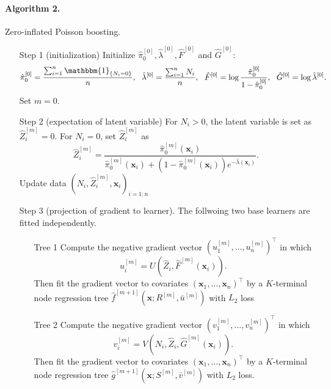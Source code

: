 \documentclass[11pt]{article}
\numberwithin{equation}{section}
\def\bx{\boldsymbol{x}}
\begin{document}
\paragraph{Algorithm 2.} Zero-inflated Poisson boosting.
\begin{itemize}
	\item[Step 1] (initialization)  Initialize $\hat{\pi}_0^{[0]}, \hat{\lambda}^{[0]}, \hat{F}^{[0]}$ and $\hat{G}^{[0]}$:
	$$\hat{\pi}_0^{[0]}=\frac{\sum_{i=1}^n\mathbbm{1}_{\{N_i=0\}}}{n},~~ \hat{\lambda}^{[0]}=\frac{\sum_{i=1}^nN_i}{n},~~
	\hat{F}^{[0]}=\log\frac{\hat{\pi}_0^{[0]}}{1-\hat{\pi}_0^{[0]}},~~
	\hat{G}^{[0]}=\log\hat{\lambda}^{[0]}.$$
	Set $m=0$.
	
	\item[Step 2] (expectation of latent variable) For $N_i>0$, the latent variable is set as $\hat{Z}_i^{[m]}=0$. For $N_i=0$, set $\hat{Z}_i^{[m]}$ as 
	$$\hat{Z}_i^{[m]}=\frac{\hat{\pi}_0^{[m]}(\bx_i)}{\hat{\pi}_0^{[m]}(\bx_i)+(1-\hat{\pi}_0^{[m]}(\bx_i))e^{-\hat{\lambda}(\bx_i)}}.$$
	Update data $(N_i,\hat{Z}_i^{[m]},\bx_i)_{i=1:n}$ 
	
	\item[Step 3] (projection of gradient to learner). The follwoing two base learners  are fitted independently. 
	\begin{itemize}
		\item[Tree 1]  Compute the negative gradient vector $(u_1^{[m]},\ldots,u_n^{[m]})^\top$ in which 
		$$u_i^{[m]}=U(\hat{Z}_i,\hat{F}^{[m]}(\bx_i)).$$
		Then fit the gradient vector to covariates $(\bx_1,\ldots,\bx_n)^\top$ by a $K$-terminal node regression tree $\hat{f}^{[m+1]}\left(\bx;R^{[m]},\bar{u}^{[m]}\right)$ with $L_2$ loss 
		
		\item[Tree 2] Compute the negative gradient vector $(v_1^{[m]},\ldots,v_n^{[m]})^\top$ in which 
		$$v_i^{[m]}=V(N_i,\hat{Z}_i,\hat{G}^{[m]}(\bx_i)).$$
		Then fit the gradient vector to covariates $(\bx_1,\ldots,\bx_n)^\top$ by a $K$-terminal node regression tree $\hat{g}^{[m+1]}\left(\bx;S^{[m]},\bar{v}^{[m]}\right)$ with $L_2$ loss.
				

\end{itemize}
\end{itemize}
\end{document}
